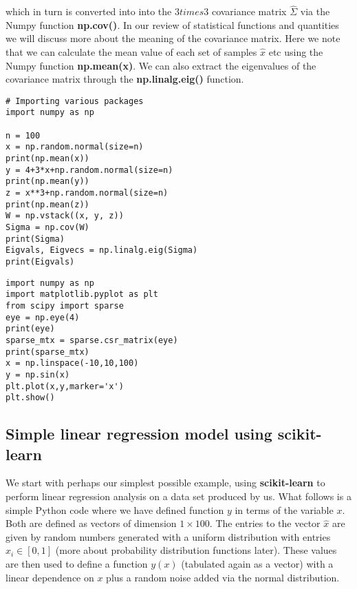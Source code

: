 \documentclass[%
oneside,                 %
final,                   %
10pt]{article}
\begin{document}
which in turn is converted into into the $3 times 3$ covariance matrix
$\hat{\Sigma}$ via the Numpy function \textbf{np.cov()}. In our review of
statistical functions and quantities we will discuss more about the
meaning of the covariance matrix. Here we note that we can calculate
the mean value of each set of samples $\hat{x}$ etc using the Numpy
function \textbf{np.mean(x)}. We can also extract the eigenvalues of the
covariance matrix through the \textbf{np.linalg.eig()} function.

\begin{verbatim}
# Importing various packages
import numpy as np

n = 100
x = np.random.normal(size=n)
print(np.mean(x))
y = 4+3*x+np.random.normal(size=n)
print(np.mean(y))
z = x**3+np.random.normal(size=n)
print(np.mean(z))
W = np.vstack((x, y, z))
Sigma = np.cov(W)
print(Sigma)
Eigvals, Eigvecs = np.linalg.eig(Sigma)
print(Eigvals)
\end{verbatim}


\begin{verbatim}
import numpy as np
import matplotlib.pyplot as plt
from scipy import sparse
eye = np.eye(4)
print(eye)
sparse_mtx = sparse.csr_matrix(eye)
print(sparse_mtx)
x = np.linspace(-10,10,100)
y = np.sin(x)
plt.plot(x,y,marker='x')
plt.show()
\end{verbatim}








\subsection*{Simple linear regression model using \textbf{scikit-learn}}

We start with perhaps our simplest possible example, using \textbf{scikit-learn} to perform linear regression analysis on a data set produced by us. 
What follows is a simple Python code where we have defined  function $y$ in terms of the variable $x$. Both are defined as vectors of dimension $1\times 100$. The entries to the vector $\hat{x}$  are given by random numbers generated with a uniform distribution with entries $x_i \in [0,1]$ (more about probability distribution functions later). These values are then used to define a function $y(x)$ (tabulated again as a vector) with a linear dependence on $x$ plus a random noise added via the normal distribution.
\end{document}
